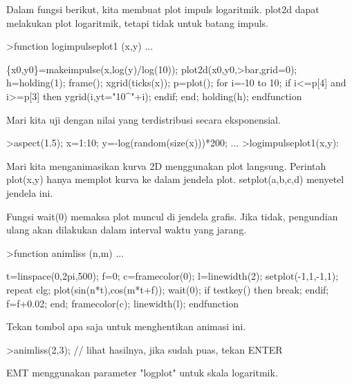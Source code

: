 \documentclass{article}
\begin{document}
\begin{eulernotebook}
\begin{eulercomment}
\begin{eulercomment}
\begin{eulercomment}
\begin{eulercomment}
\begin{eulercomment}
\begin{eulercomment}
\begin{eulercomment}
Dalam  fungsi  berikut,  kita  membuat  plot  impuls  logaritmik.
plot2d dapat  melakukan  plot  logaritmik,  tetapi  tidak  untuk
batang  impuls.
\end{eulercomment}
\begin{eulerprompt}
>function logimpulseplot1 (x,y) ...
\end{eulerprompt}
\begin{eulerudf}
    \{x0,y0\}=makeimpulse(x,log(y)/log(10));
    plot2d(x0,y0,>bar,grid=0);
    h=holding(1);
    frame();
    xgrid(ticks(x));
    p=plot();
    for i=-10 to 10;
      if i<=p[4] and i>=p[3] then
         ygrid(i,yt="10^"+i);
      endif;
    end;
    holding(h);
  endfunction
\end{eulerudf}
\begin{eulercomment}
Mari  kita  uji  dengan  nilai  yang  terdistribusi  secara
eksponensial.
\end{eulercomment}
\begin{eulerprompt}
>aspect(1.5); x=1:10; y=-log(random(size(x)))*200; ...
>logimpulseplot1(x,y):
\end{eulerprompt}
\begin{eulercomment}
Mari  kita  menganimasikan  kurva  2D  menggunakan  plot  langsung.
Perintah  plot(x,y)  hanya  memplot  kurva  ke  dalam  jendela  plot.
setplot(a,b,c,d)  menyetel  jendela  ini.

Fungsi  wait(0)  memaksa  plot  muncul  di  jendela  grafis.  Jika
tidak,  pengundian  ulang  akan  dilakukan  dalam  interval  waktu
yang jarang.
\end{eulercomment}
\begin{eulerprompt}
>function animliss (n,m) ...
\end{eulerprompt}
\begin{eulerudf}
  t=linspace(0,2pi,500);
  f=0;
  c=framecolor(0);
  l=linewidth(2);
  setplot(-1,1,-1,1);
  repeat
    clg;
    plot(sin(n*t),cos(m*t+f));
    wait(0);
    if testkey() then break; endif;
    f=f+0.02;
  end;
  framecolor(c);
  linewidth(l);
  endfunction
\end{eulerudf}
\begin{eulercomment}
Tekan  tombol  apa  saja  untuk  menghentikan  animasi  ini.
\end{eulercomment}
\begin{eulerprompt}
>animliss(2,3); // lihat hasilnya, jika sudah puas, tekan ENTER
\end{eulerprompt}
\begin{eulercomment}
EMT menggunakan parameter "logplot" untuk skala logaritmik.


\end{eulercomment}
\end{eulercomment}
\end{eulercomment}
\end{eulercomment}
\end{eulercomment}
\end{eulercomment}
\end{eulercomment}
\end{eulernotebook}
\end{document}
